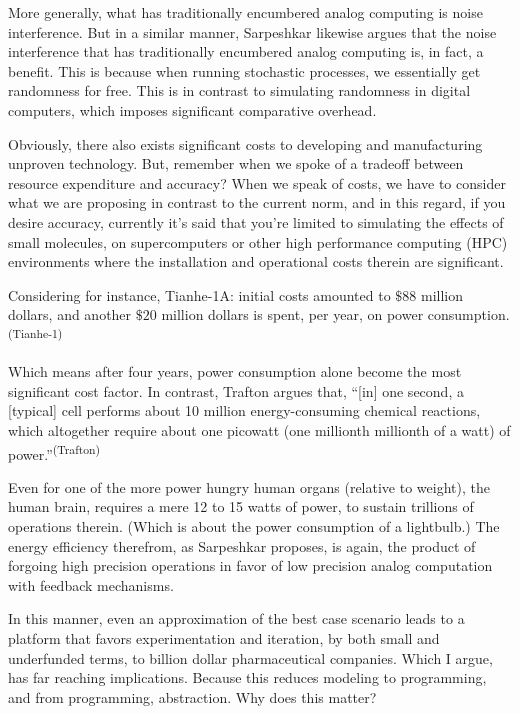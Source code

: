 More generally, what has traditionally encumbered analog computing is noise interference. But in a similar manner, Sarpeshkar likewise argues that the noise interference that has traditionally encumbered analog computing is, in fact, a benefit. This is because when running stochastic processes, we essentially get randomness for free. This is in contrast to simulating randomness in digital computers, which imposes significant comparative overhead.

Obviously, there also exists significant costs to developing and manufacturing unproven technology. But, remember when we spoke of a tradeoff between resource expenditure and accuracy? When we speak of costs, we have to consider what we are proposing in contrast to the current norm, and in this regard, if you desire accuracy, currently it's said that you're limited to simulating the effects of small molecules, on supercomputers or other high performance computing (HPC) environments where the installation and operational costs therein are significant.

Considering for instance, Tianhe-1A: initial costs amounted to $\$88$ million dollars, and another $\$20$ million dollars is spent, per year, on power consumption.\textsuperscript{(Tianhe-1)} 

Which means after four years, power consumption alone become the most significant cost factor. In contrast, Trafton argues that, ``[in] one second, a [typical] cell performs about 10 million energy-consuming chemical reactions, which altogether require about one picowatt (one millionth millionth of a watt) of power.''\textsuperscript{(Trafton)}

Even for one of the more power hungry human organs (relative to weight), the human brain, requires a mere 12 to 15 watts of power, to sustain trillions of operations therein. (Which is about the power consumption of a lightbulb.) The energy efficiency therefrom, as Sarpeshkar proposes, is again, the product of forgoing high precision operations in favor of low precision analog computation with feedback mechanisms.



In this manner, even an approximation of the best case scenario leads to a platform that favors experimentation and iteration, by both small and underfunded terms, to billion dollar pharmaceutical companies. Which I argue, has far reaching implications. Because this reduces modeling to programming, and from programming, abstraction. Why does this matter?

